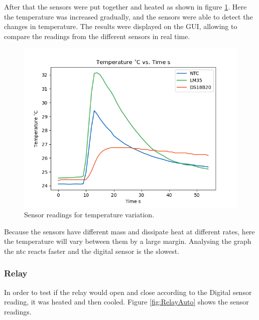 \documentclass[12pt]{article}
\begin{document}
        After that the sensors were put together and heated as shown in figure \ref{fig:VarTemp}. Here the temperature was increased gradually, and the sensors were able to detect the changes in temperature. The results were displayed on the GUI, allowing to compare the readings from the different sensors in real time.

        \begin{figure}[H] 
            \centering
            \includegraphics*[scale = 0.5]{images/VarTempTest.png}
            \caption{Sensor readings for temperature variation.}
            \label{fig:VarTemp}
        \end{figure}

        Because the sensors have different mass and dissipate heat at different rates, here the temperature will vary between them by a large margin. Analysing the graph the ntc reacts faster and the digital sensor is the slowest.  


    \subsubsection{Relay}
        In order to test if the relay would open and close according to the Digital sensor reading, it was heated and then cooled. Figure \ref{fig:RelayAuto} shows the sensor readings. 
\end{document}
